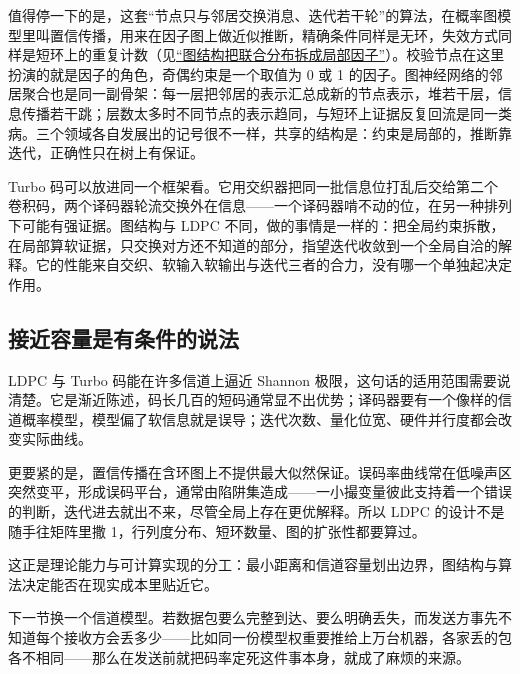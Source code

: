 值得停一下的是，这套``节点只与邻居交换消息、迭代若干轮''的算法，在概率图模型里叫置信传播，用来在因子图上做近似推断，精确条件同样是无环，失效方式同样是短环上的重复计数（见\hyperref[sec:13-Machine-Learning/07-Graphical-and-Sequential-Models/01]{``图结构把联合分布拆成局部因子''}）。校验节点在这里扮演的就是因子的角色，奇偶约束是一个取值为 0 或 1 的因子。图神经网络的邻居聚合也是同一副骨架：每一层把邻居的表示汇总成新的节点表示，堆若干层，信息传播若干跳；层数太多时不同节点的表示趋同，与短环上证据反复回流是同一类病。三个领域各自发展出的记号很不一样，共享的结构是：约束是局部的，推断靠迭代，正确性只在树上有保证。

Turbo 码可以放进同一个框架看。它用交织器把同一批信息位打乱后交给第二个卷积码，两个译码器轮流交换外在信息——一个译码器啃不动的位，在另一种排列下可能有强证据。图结构与 LDPC 不同，做的事情是一样的：把全局约束拆散，在局部算软证据，只交换对方还不知道的部分，指望迭代收敛到一个全局自洽的解释。它的性能来自交织、软输入软输出与迭代三者的合力，没有哪一个单独起决定作用。

\subsection{接近容量是有条件的说法}

LDPC 与 Turbo 码能在许多信道上逼近 Shannon 极限，这句话的适用范围需要说清楚。它是渐近陈述，码长几百的短码通常显不出优势；译码器要有一个像样的信道概率模型，模型偏了软信息就是误导；迭代次数、量化位宽、硬件并行度都会改变实际曲线。

更要紧的是，置信传播在含环图上不提供最大似然保证。误码率曲线常在低噪声区突然变平，形成误码平台，通常由陷阱集造成——一小撮变量彼此支持着一个错误的判断，迭代进去就出不来，尽管全局上存在更优解释。所以 LDPC 的设计不是随手往矩阵里撒 1，行列度分布、短环数量、图的扩张性都要算过。

这正是理论能力与可计算实现的分工：最小距离和信道容量划出边界，图结构与算法决定能否在现实成本里贴近它。

下一节换一个信道模型。若数据包要么完整到达、要么明确丢失，而发送方事先不知道每个接收方会丢多少——比如同一份模型权重要推给上万台机器，各家丢的包各不相同——那么在发送前就把码率定死这件事本身，就成了麻烦的来源。
